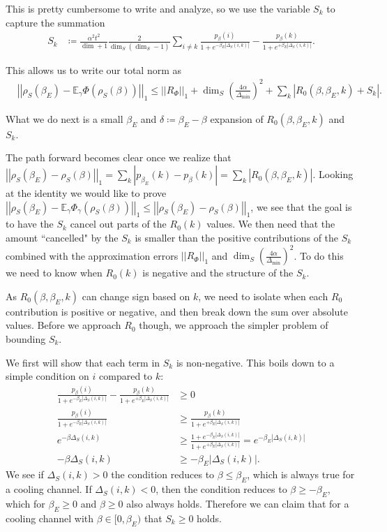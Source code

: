 \documentclass{article}
\newcommand{\parens}[1]{\left( #1 \right)}
\newcommand{\abs}[1]{\left| #1 \right|}
\newcommand{\norm}[1]{\left| \left| #1 \right| \right|}
\begin{document}
This is pretty cumbersome to write and analyze, so we use the variable $S_k$ to capture the summation
\begin{align}
    S_k &\coloneqq \frac{\alpha^2 t^2}{\dim + 1} \frac{2}{\dim_S (\dim_S - 1)} \sum_{i \neq k} \frac{p_{\beta}(i)}{1 + e^{- \beta_E |\Delta_S(i,k)|}} - \frac{p_{\beta}(k)}{1 + e^{+ \beta_E |\Delta_S(i,k)|}}. \label{eq:single_shot_sum_def}
\end{align}

This allows us to write our total norm as
\begin{align}
    &\norm{\rho_S(\beta_E) - \mathbb{E}_{\gamma} \Phi(\rho_S(\beta)) }_1 \leq \norm{R_{\Phi}}_1 + \dim_S \parens{\frac{4 \alpha}{\Delta_{\min}}}^2 + \sum_k \abs{ R_0(\beta, \beta_E, k) + S_k }. \label{eq:single_shot_capture_sum}
\end{align}

What we do next is a small $\beta_E$ and $\delta \coloneqq \beta_E - \beta$ expansion of $R_0(\beta, \beta_E, k)$ and $S_k$. 

The path forward becomes clear once we realize that $\norm{\rho_S(\beta_E) - \rho_S(\beta)}_1 = \sum_k \abs{p_{\beta_E}(k) - p_{\beta}(k)} = \sum_k \abs{R_0(\beta, \beta_E, k)}$. Looking at the identity we would like to prove $\norm{\rho_S(\beta_E) - \mathbb{E}_{\gamma} \Phi_{\gamma}(\rho_S(\beta))}_1 \leq \norm{\rho_S(\beta_E) - \rho_S(\beta)}_1$, we see that the goal is to have the $S_k$ cancel out parts of the $R_0(k)$ values. We then need that the amount ``cancelled" by the $S_k$ is smaller than the positive contributions of the $S_k$ combined with the approximation errors $\norm{R_{\Phi}}_1$ and $\dim_S \parens{\frac{4 \alpha}{\Delta_{\min}}}^2$. To do this we need to know when $R_0(k)$ is negative and the structure of the $S_k$. 

As $R_0(\beta, \beta_E, k)$ can change sign based on $k$, we need to isolate when each $R_0$ contribution is positive or negative, and then break down the sum over absolute values. Before we approach $R_0$ though, we approach the simpler problem of bounding $S_k$. 

We first will show that each term in $S_k$ is non-negative. This boils down to a simple condition on $i$ compared to $k$: 
\begin{align}
    \frac{p_{\beta}(i)}{1 + e^{- \beta_E |\Delta_S(i,k)|}} - \frac{p_{\beta}(k)}{1 + e^{+ \beta_E |\Delta_S(i,k)|}} &\geq 0 \\
    \frac{p_{\beta}(i)}{1 + e^{-\beta_E |\Delta_S(i,k)|}} &\geq \frac{p_{\beta}(k)}{1 + e^{+\beta_E |\Delta_S(i,k)|}} \\
    e^{-\beta \Delta_S(i,k)} &\geq \frac{1 + e^{-\beta_E |\Delta_S(i,k)|}}{1 + e^{+ \beta_E |\Delta_S(i,k)|}} = e^{-\beta_E |\Delta_S(i,k)|} \\
    -\beta \Delta_S(i,k) &\geq -\beta_E |\Delta_S(i,k)|.
\end{align}
We see if $\Delta_S(i,k) > 0$ the condition reduces to $\beta \leq \beta_E$, which is always true for a cooling channel. If $\Delta_S(i,k) < 0$, then the condition reduces to $\beta \geq - \beta_E$, which for $\beta_E \geq 0$ and $\beta \geq 0$ also always holds. Therefore we can claim that for a cooling channel with $\beta \in [0, \beta_E)$ that $S_k \geq 0$ holds.
\end{document}
